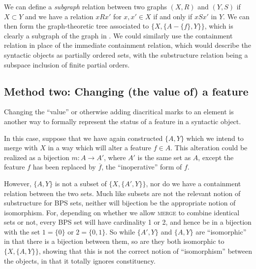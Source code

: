 \documentclass[output=paper]{langsci/langscibook}
\begin{document}
We can define a \emph{subgraph} relation between two graphs $(X,R)$ and $(Y,S)$
if $X\subset Y$ and we have a relation $xRx'$ for $x,x'\in X$ if
and only if $xSx'$ in $Y$. We can then form the graph-theoretic tree
associated to $\{X,\{A-\{f\},Y\}\}$, which is clearly a subgraph of the graph
in . We could similarly use the containment relation in
place of the immediate containment relation, which would describe the syntactic
objects as partially ordered sets, with the substructure relation being a
subspace inclusion of finite partial orders.

\subsection{Method two: Changing (the value of) a feature}\label{sec:33.3.2}

Changing the \enquote{value} or otherwise adding diacritical marks to an element is
another way to formally represent the status of a feature in a syntactic
object.

In this case, suppose that we have again constructed $\{A,Y\}$ which we intend
to merge with $X$ in a way which will alter a feature $f\in A$. This
alteration could be realized as a bijection $m:A\rightarrow A'$, where $A'$ is
the same set as $A$, except the feature $f$ has been replaced by
$\overline{f}$, the ``inoperative'' form of $f$.

However, $\{A,Y\}$ is not a subset of $\{X,\{A',Y\}\}$, nor do we have a
containment relation between the two sets. Much like subsets are not the
relevant notion of substructure for \gls{BPS} sets, neither will bijection be
the appropriate notion of isomorphism. For, depending on whether we allow
\textsc{merge} to combine identical sets or not, every \gls{BPS} set will have
cardinality 1 or 2, and hence be in a bijection with the set $1=\{0\}$ or
$2=\{0,1\}$. So while $\{A',Y\}$ and $\{A,Y\}$ are \enquote{isomorphic} in that there
is a bijection between them, so are they both isomorphic to $\{X,\{A,Y\}\}$,
showing that this is not the correct notion of \enquote{isomorphism} between the
objects, in that it totally ignores constituency.
\end{document}
